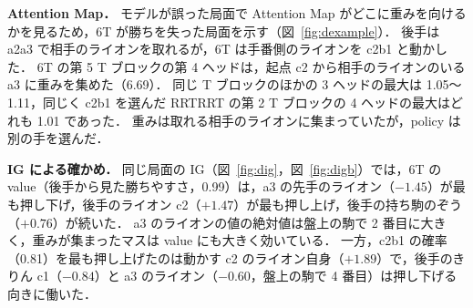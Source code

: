 \documentclass[submit]{ipsj}
\begin{document}
\textbf{Attention Map．}
モデルが誤った局面で Attention Map がどこに重みを向けるかを見るため，6T が勝ちを失った局面を示す（図~\ref{fig:dexample}）．
後手は a2a3 で相手のライオンを取れるが，6T は手番側のライオンを c2b1 と動かした．
6T の第 5 T ブロックの第 4 ヘッドは，起点 c2 から相手のライオンのいる a3 に重みを集めた（6.69）．
同じ T ブロックのほかの 3 ヘッドの最大は 1.05〜1.11，同じく c2b1 を選んだ RRTRRT の第 2 T ブロックの 4 ヘッドの最大はどれも 1.01 であった．
重みは取れる相手のライオンに集まっていたが，policy は別の手を選んだ．

\textbf{IG による確かめ．}
同じ局面の IG（図~\ref{fig:dig}，図~\ref{fig:digb}）では，6T の value（後手から見た勝ちやすさ，0.99）は，a3 の先手のライオン（$-1.45$）が最も押し下げ，後手のライオン c2（$+1.47$）が最も押し上げ，後手の持ち駒のぞう（$+0.76$）が続いた．
a3 のライオンの値の絶対値は盤上の駒で 2 番目に大きく，重みが集まったマスは value にも大きく効いている．
一方，c2b1 の確率（0.81）を最も押し上げたのは動かす c2 のライオン自身（$+1.89$）で，後手のきりん c1（$-0.84$）と a3 のライオン（$-0.60$，盤上の駒で 4 番目）は押し下げる向きに働いた．
\end{document}
